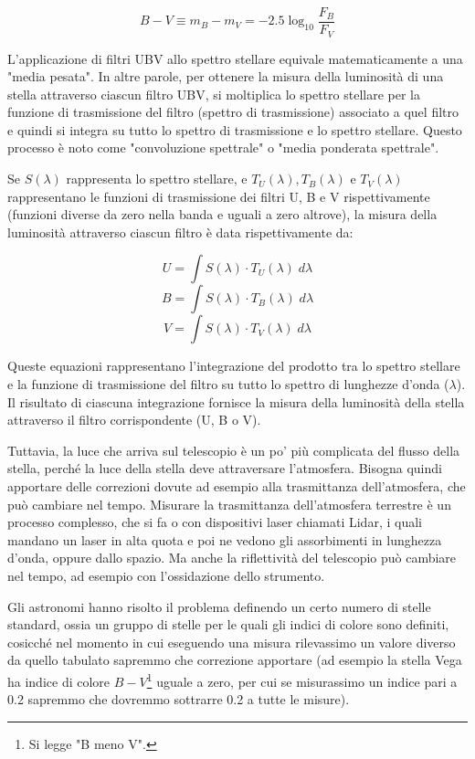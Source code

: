 \begin{equation}
   B-V \equiv m_B -m_V=-2.5 \log_{10} \frac{F_B}{F_V}
\end{equation}

L'applicazione di filtri UBV allo spettro stellare equivale matematicamente a una "media pesata". In altre parole, per ottenere la misura della luminosità di una stella attraverso ciascun filtro UBV, si moltiplica lo spettro stellare per la funzione di trasmissione del filtro (spettro di trasmissione) associato a quel filtro e quindi si integra su tutto lo spettro di trasmissione e lo spettro stellare. Questo processo è noto come "convoluzione spettrale" o "media ponderata spettrale".

Se $S(\lambda)$ rappresenta lo spettro stellare, e $T_U(\lambda), T_B(\lambda)$ e $T_V(\lambda)$ rappresentano le funzioni di trasmissione dei filtri U, B e V rispettivamente (funzioni diverse da zero nella banda e uguali a zero altrove), la misura della luminosità attraverso ciascun filtro è data rispettivamente da:

$$U = \int S(\lambda) \cdot T_U(\lambda) \; d\lambda$$
$$B = \int S(\lambda) \cdot T_B(\lambda) \; d\lambda$$
$$V = \int S(\lambda) \cdot T_V(\lambda) \; d\lambda$$

Queste equazioni rappresentano l'integrazione del prodotto tra lo spettro stellare e la funzione di trasmissione del filtro su tutto lo spettro di lunghezze d'onda ($\lambda$). Il risultato di ciascuna integrazione fornisce la misura della luminosità della stella attraverso il filtro corrispondente (U, B o V).

\vspace{0.2cm}Tuttavia, la luce che arriva sul telescopio è un po' più complicata del flusso della stella, perché la luce della stella deve attraversare l'atmosfera. Bisogna quindi apportare delle correzioni dovute ad esempio alla trasmittanza dell'atmosfera, che può cambiare nel tempo. Misurare la trasmittanza dell'atmosfera terrestre è un processo complesso, che si fa o con dispositivi laser chiamati Lidar, i quali mandano un laser in alta quota e poi ne vedono gli assorbimenti in lunghezza d'onda, oppure dallo spazio. Ma anche la riflettività del telescopio può cambiare nel tempo, ad esempio con l'ossidazione dello strumento. 

Gli astronomi hanno risolto il problema definendo un certo numero di stelle standard, ossia un gruppo di stelle per le quali gli indici di colore sono definiti, cosicché nel momento in cui eseguendo una misura rilevassimo un valore diverso da quello tabulato sapremmo che correzione apportare (ad esempio la stella Vega ha indice di colore $B-V$\footnote{Si legge "B meno V".} uguale a zero, per cui se misurassimo un indice pari a 0.2 sapremmo che dovremmo sottrarre 0.2 a tutte le misure).

